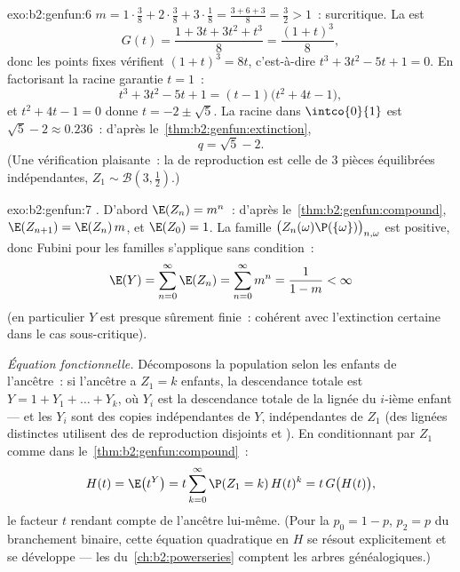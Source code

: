 \begin{solution}{exo:b2:genfun:6}
$m = 1\cdot\frac38 + 2\cdot\frac38 + 3\cdot\frac18 = \frac{3 + 6 +
3}{8} = \frac32 > 1$~: surcritique. La  est
\[
G(t) = \frac{1 + 3t + 3t^2 + t^3}{8} = \frac{(1 + t)^3}{8} ,
\]
donc les points fixes vérifient $(1 + t)^3 = 8t$, c'est-à-dire $t^3 +
3t^2 - 5t + 1 = 0$. En factorisant la racine garantie $t = 1$~:
\[
t^3 + 3t^2 - 5t + 1 = (t - 1)\bigl(t^2 + 4t - 1\bigr),
\]
et $t^2 + 4t - 1 = 0$ donne $t = -2 \pm \sqrt5$. La racine dans
$\intco{0}{1}$ est $\sqrt5 - 2 \approx 0.236$~: d'après le~\cref{thm:b2:genfun:extinction},
\[
q = \sqrt 5 - 2 .
\]
(Une vérification plaisante~: la  de reproduction est celle de $3$
pièces équilibrées indépendantes, $Z_1 \sim \mathcal{B}(3, \frac12)$.)
\end{solution}

\begin{solution}{exo:b2:genfun:7}
\emph{.} D'abord $\E(Z_n) = m^n$~: d'après le~\cref{thm:b2:genfun:compound}, $\E(Z_{n+1}) = \E(Z_n)\,m$, et
$\E(Z_0) = 1$. La famille $\bigl(Z_n(\omega)\P(\{\omega\})
\bigr)_{n, \omega}$ est positive, donc Fubini pour les familles
s'applique sans condition~:
\[
\E(Y) = \sum_{n=0}^{\infty}\E(Z_n)
= \sum_{n=0}^\infty m^n = \frac{1}{1 - m} < \infty
\]
(en particulier $Y$ est presque sûrement finie~: cohérent avec
l'extinction certaine dans le cas sous-critique).

\emph{Équation fonctionnelle.} Décomposons la population selon les
enfants de l'ancêtre~: si l'ancêtre a $Z_1 = k$ enfants, la
descendance totale est $Y = 1 + Y_1 + \dots + Y_k$, où $Y_i$ est la
descendance totale de la lignée du $i$-ième enfant --- et les $Y_i$
sont des copies indépendantes de $Y$, indépendantes de $Z_1$ (des
lignées distinctes utilisent des  de reproduction disjoints
et ). En conditionnant par $Z_1$ comme dans le~\cref{thm:b2:genfun:compound}~:
\[
H(t) = \E\bigl(t^Y\bigr)
= t\sum_{k=0}^\infty \P(Z_1 = k)\,H(t)^k
= t\,G\bigl(H(t)\bigr),
\]
le facteur $t$ rendant compte de l'ancêtre lui-même. (Pour la
 $p_0 = 1 - p$, $p_2 = p$ du branchement binaire, cette équation
quadratique en $H$ se résout explicitement et se développe --- les
 du~\cref{ch:b2:powerseries} comptent les arbres
généalogiques.)
\end{solution}

